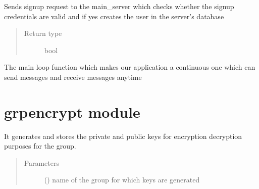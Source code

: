\documentclass[letterpaper,10pt,english]{sphinxmanual}
\begin{document}

\begin{fulllineitems}
\label{\detokenize{client:client.signup}}
Sends signup request to the main\_server which checks whether the signup credentials are valid and if yes creates the user in the server’s database
\begin{quote}\begin{description}
\item[{Return type}] \leavevmode
bool

\end{description}\end{quote}

\end{fulllineitems}


\begin{fulllineitems}
\label{\detokenize{client:client.talk}}
The main loop function which makes our application a continuous one which can send messages and receive messages anytime

\end{fulllineitems}



\section{grpencrypt module}
\label{\detokenize{grpencrypt:module-grpencrypt}}\label{\detokenize{grpencrypt:grpencrypt-module}}\label{\detokenize{grpencrypt::doc}}

\begin{fulllineitems}
\label{\detokenize{grpencrypt:grpencrypt.genkeys}}
It generates and stores the private and public keys for encryption decryption purposes for the group.
\begin{quote}\begin{description}
\item[{Parameters}] \leavevmode
{} () \textendash{} name of the group for which keys are generated

\end{description}\end{quote}

\end{fulllineitems}
\end{document}
